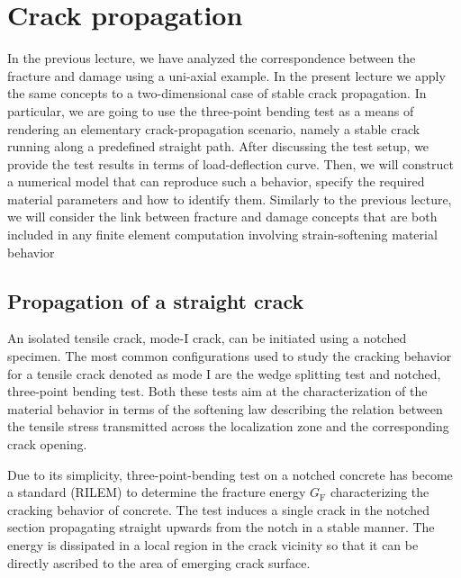 \documentclass[main.tex]{subfiles}
\begin{document}
\chapter{Crack propagation}
\label{LEC:CrackPropagation}

In the previous lecture, we have analyzed the correspondence between the fracture and damage using a uni-axial example. In the present lecture we apply the same concepts to a two-dimensional case of stable crack propagation.
In particular, we are going to use the three-point bending test as a means of  rendering an elementary crack-propagation scenario, namely a stable crack running along a predefined straight path. After discussing the test setup, we provide the test results in terms of load-deflection curve. Then, we will construct a numerical model that can reproduce such a behavior, specify the required material parameters and how to identify them.
Similarly to the previous lecture, we will consider the link between fracture and damage concepts that are both included in any finite element computation involving strain-softening material behavior

\section{Propagation of a straight crack}

An isolated tensile crack, mode-I crack, can be initiated using a notched specimen. The most common configurations used to study the cracking behavior for a tensile crack denoted as mode I are the wedge splitting test and notched, three-point bending test. Both these tests aim at the characterization of the material behavior in terms of the softening law describing the relation between the tensile stress transmitted across the localization zone and the corresponding crack opening. 

Due to its simplicity, three-point-bending test on a notched concrete has become a standard (RILEM) to determine the fracture energy $G_\mathrm{F}$ characterizing the cracking behavior of concrete. The test induces a single crack in the notched section propagating straight upwards from the notch in a stable manner. The energy is dissipated in a local region in the crack vicinity so that it can be directly ascribed to the area of emerging crack surface. 
\end{document}
